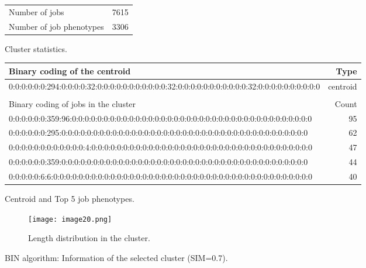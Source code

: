 \documentclass{jhps}
\begin{document}
\begin{figure}
	\begin{subtable}{\textwidth}
		\centering
		\begin{tabular}{lr}
			Number of jobs & 7615 \\
			Number of job phenotypes & 3306 \\
		\end{tabular}
		\caption{Cluster statistics.}
		\label{cluster:bin_all:stats}
	\end{subtable}
	\medskip
	\begin{subtable}{\textwidth}
		\centering
		\begin{tiny}
			\begin{tabular}{l|r}
				\rowcolor{tblhead}
				Binary coding of the centroid                                                                    &  Type     \\
				\hline
				0:0:0:0:0:0:294:0:0:0:0:32:0:0:0:0:0:0:0:0:0:0:0:32:0:0:0:0:0:0:0:0:0:0:0:32:0:0:0:0:0:0:0:0:0:0 &  centroid \\
				\multicolumn{2}{l}{}                                                                             \\
				\rowcolor{tblhead}
				Binary coding of jobs in the cluster                                                             &  Count    \\
				\hline
				0:0:0:0:0:0:359:96:0:0:0:0:0:0:0:0:0:0:0:0:0:0:0:0:0:0:0:0:0:0:0:0:0:0:0:0:0:0:0:0:0:0:0:0:0:0   &  95       \\
				0:0:0:0:0:0:295:0:0:0:0:0:0:0:0:0:0:0:0:0:0:0:0:0:0:0:0:0:0:0:0:0:0:0:0:0:0:0:0:0:0:0:0:0:0:0    &  62       \\
				0:0:0:0:0:0:0:0:0:0:0:0:4:0:0:0:0:0:0:0:0:0:0:0:0:0:0:0:0:0:0:0:0:0:0:0:0:0:0:0:0:0:0:0:0:0:0:0  &  47       \\
				0:0:0:0:0:0:359:0:0:0:0:0:0:0:0:0:0:0:0:0:0:0:0:0:0:0:0:0:0:0:0:0:0:0:0:0:0:0:0:0:0:0:0:0:0:0    &  44       \\
				0:0:0:0:0:6:6:0:0:0:0:0:0:0:0:0:0:0:0:0:0:0:0:0:0:0:0:0:0:0:0:0:0:0:0:0:0:0:0:0:0:0:0:0:0:0:0:0  &  40       \\
			\end{tabular}
		\end{tiny}
		\caption{Centroid and Top 5 job phenotypes.}
		\label{cluster:bin_all:top_jobs}
	\end{subtable}
	\medskip
	\begin{subfigure}{\textwidth}
		\centering
		\texttt{[image: image20.png]}
		\caption{Length distribution in the cluster.}
		\label{cluster:bin_all:length}
	\end{subfigure}
	\caption{BIN algorithm: Information of the selected cluster (SIM=0.7).}
	\label{cluster:bin_all}
\end{figure}
\end{document}
